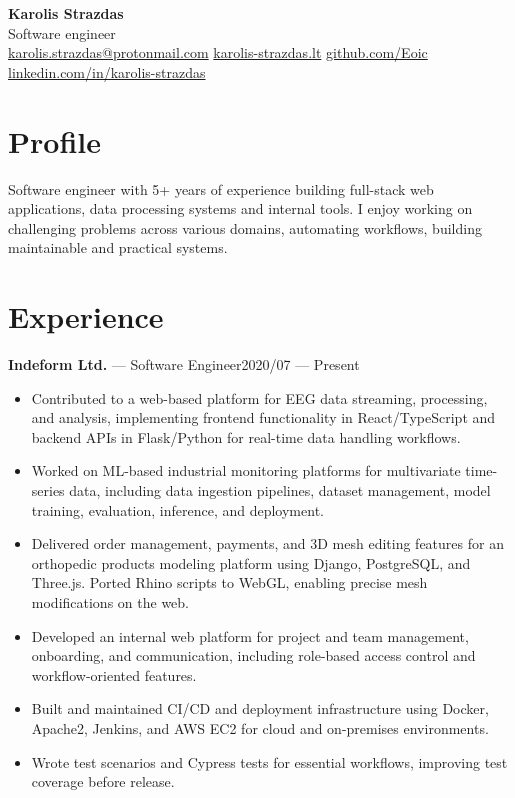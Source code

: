 \documentclass[10pt,a4paper]{article}
\makeatletter
\newcommand{\entry}[3]{\noindent\textbf{#1} — #2\hfill #3\\}
\newcommand{\Name}{Karolis Strazdas}
\newcommand{\Email}{karolis.strazdas@protonmail.com}
\newcommand{\Website}{https://karolis-strazdas.lt}
\newcommand{\GitHub}{https://github.com/Eoic}
\newcommand{\LinkedIn}{https://www.linkedin.com/in/karolis-strazdas/}
\makeatother
\begin{document}
\pagestyle{empty}

\begin{center}
	{\Huge\bfseries \Name}\\[0.6em]
    \Large Software engineer \\[0.8em]
	\small \href{mailto:\Email}{\Email} \quad\textbullet\quad \href{\Website}{karolis-strazdas.lt} \quad\textbullet\quad \href{\GitHub}{github.com/Eoic} \quad\textbullet\quad \href{\LinkedIn}{linkedin.com/in/karolis-strazdas}
\end{center}

\vspace{-0.4em}

\begingroup\small

\section*{Profile}
Software engineer with 5+ years of experience building full-stack web applications, data processing systems and internal tools. I enjoy working on challenging problems across various domains, automating workflows, building maintainable and practical systems.

\section*{Experience}
\entry{Indeform Ltd.}{Software Engineer}{2020/07 --- Present}
\vspace{-0.8em}
\begin{itemize}[leftmargin=*,itemsep=0.0em,topsep=0.02em]
    \item Contributed to a web-based platform for EEG data streaming, processing, and analysis, implementing frontend functionality in React/TypeScript and backend APIs in Flask/Python for real-time data handling workflows.

    \item Worked on ML-based industrial monitoring platforms for multivariate time-series data, including data ingestion pipelines, dataset management, model training, evaluation, inference, and deployment.

    \item Delivered order management, payments, and 3D mesh editing features for an orthopedic products modeling platform using Django, PostgreSQL, and Three.js. Ported Rhino scripts to WebGL, enabling precise mesh modifications on the web.

    \item Developed an internal web platform for project and team management, onboarding, and communication, including role-based access control and workflow-oriented features.

    \item Built and maintained CI/CD and deployment infrastructure using Docker, Apache2, Jenkins, and AWS EC2 for cloud and on\mbox{-}premises environments.

    \item Wrote test scenarios and Cypress tests for essential workflows, improving test coverage before release.
\end{itemize}
\end{document}
